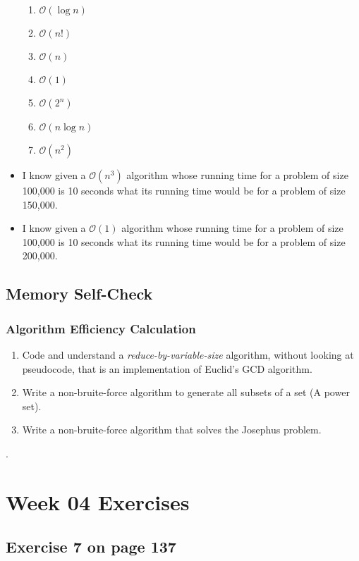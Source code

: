 \documentclass[12pt]{amsart}
\begin{document}
\begin{itemize}
    \begin{enumerate}
    \item $\mathcal{O}(\log n)$
    \item  $\mathcal{O}(n!)$
    \item  $\mathcal{O}(n)$
    \item  $\mathcal{O}(1)$
    \item  $\mathcal{O}(2^n)$
    \item  $\mathcal{O}(n \log n)$
    \item  $\mathcal{O}(n^2)$
   \end{enumerate}
\item  I know given a $\mathcal{O}(n^3)$ algorithm whose running time for a problem of size 100,000 is 10 seconds what its running time would be for a problem of size 150,000.
\item  I know given a $\mathcal{O}(1)$ algorithm whose running time for a problem of size 100,000 is 10 seconds what its running time would be for a problem of size 200,000.

\end{itemize}
\subsection{Memory Self-Check}

\subsubsection{Algorithm Efficiency Calculation}


\begin{enumerate}
     \item Code and understand a \textit{reduce-by-variable-size} algorithm, without looking at pseudocode, that is an implementation of Euclid's GCD algorithm.
     \item Write a non-bruite-force algorithm to generate all subsets of a set (A power set).
     \item Write a non-bruite-force algorithm that solves the Josephus problem.
\end{enumerate}.



\section{Week 04 Exercises}
\subsection{ Exercise 7 on page 137} 
\end{document}
